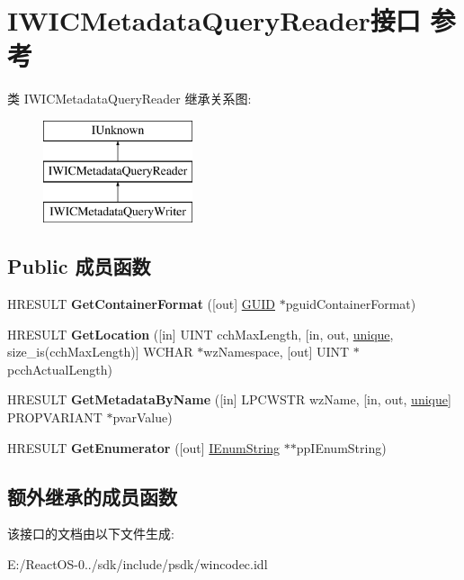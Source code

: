 \hypertarget{interface_i_w_i_c_metadata_query_reader}{}\section{I\+W\+I\+C\+Metadata\+Query\+Reader接口 参考}
\label{interface_i_w_i_c_metadata_query_reader}
类 I\+W\+I\+C\+Metadata\+Query\+Reader 继承关系图\+:\begin{figure}[H]
\begin{center}
\leavevmode
\includegraphics[height=3.000000cm]{interface_i_w_i_c_metadata_query_reader}
\end{center}
\end{figure}
\subsection*{Public 成员函数}
\begin{DoxyCompactItemize}
\item 
\mbox{\label{interface_i_w_i_c_metadata_query_reader_a0773593dc3f34d4129eb90071d0daf0e}} 
H\+R\+E\+S\+U\+LT {\bfseries Get\+Container\+Format} (\mbox{[}out\mbox{]} \hyperlink{interface_g_u_i_d}{G\+U\+ID} $\ast$pguid\+Container\+Format)
\item 
\mbox{\label{interface_i_w_i_c_metadata_query_reader_a2da026afd63e8a0d4f09af82a168b861}} 
H\+R\+E\+S\+U\+LT {\bfseries Get\+Location} (\mbox{[}in\mbox{]} U\+I\+NT cch\+Max\+Length, \mbox{[}in, out, \hyperlink{interfaceunique}{unique}, size\+\_\+is(cch\+Max\+Length)\mbox{]} W\+C\+H\+AR $\ast$wz\+Namespace, \mbox{[}out\mbox{]} U\+I\+NT $\ast$pcch\+Actual\+Length)
\item 
\mbox{\label{interface_i_w_i_c_metadata_query_reader_aca1360c0ced5d2756e714bb07bd5c6aa}} 
H\+R\+E\+S\+U\+LT {\bfseries Get\+Metadata\+By\+Name} (\mbox{[}in\mbox{]} L\+P\+C\+W\+S\+TR wz\+Name, \mbox{[}in, out, \hyperlink{interfaceunique}{unique}\mbox{]} P\+R\+O\+P\+V\+A\+R\+I\+A\+NT $\ast$pvar\+Value)
\item 
\mbox{\label{interface_i_w_i_c_metadata_query_reader_a5f38907870488696bf5e2e901159a571}} 
H\+R\+E\+S\+U\+LT {\bfseries Get\+Enumerator} (\mbox{[}out\mbox{]} \hyperlink{interface_i_enum_string}{I\+Enum\+String} $\ast$$\ast$pp\+I\+Enum\+String)
\end{DoxyCompactItemize}
\subsection*{额外继承的成员函数}


该接口的文档由以下文件生成\+:\begin{DoxyCompactItemize}
\item 
E\+:/\+React\+O\+S-\/0../sdk/include/psdk/wincodec.\+idl\end{DoxyCompactItemize}

